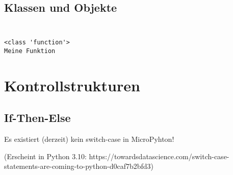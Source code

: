 \documentclass[11pt]{article}
\makeatletter
\newcommand{\boxspacing}{\kern\kvtcb@left@rule\kern\kvtcb@boxsep}
\newcommand{\prompt}[4]{
        {\ttfamily\llap{{\color{#2}[#3]:\hspace{3pt}#4}}\vspace{-\baselineskip}}
    }
\makeatother
\begin{document}
    \hypertarget{klassen-und-objekte}{%
\subsection{Klassen und Objekte}\label{klassen-und-objekte}}

    \begin{tcolorbox}[breakable, size=fbox, boxrule=1pt, pad at break*=1mm,colback=cellbackground, colframe=cellborder]
\prompt{In}{incolor}{199}{\boxspacing}
\begin{Verbatim}[commandchars=\\\{\}]

\end{Verbatim}
\end{tcolorbox}

    \begin{tcolorbox}[breakable, size=fbox, boxrule=1pt, pad at break*=1mm,colback=cellbackground, colframe=cellborder]
\prompt{In}{incolor}{199}{\boxspacing}
\begin{Verbatim}[commandchars=\\\{\}]

\end{Verbatim}
\end{tcolorbox}

    \begin{Verbatim}[commandchars=\\\{\}]
<class 'function'>
Meine Funktion
    \end{Verbatim}

    \hypertarget{kontrollstrukturen}{%
\section{Kontrollstrukturen}\label{kontrollstrukturen}}

    \hypertarget{if-then-else}{%
\subsection{If-Then-Else}\label{if-then-else}}

Es existiert (derzeit) kein switch-case in MicroPyhton!

(Erscheint in Python 3.10:
https://towardsdatascience.com/switch-case-statements-are-coming-to-python-d0caf7b2bfd3)
\end{document}
